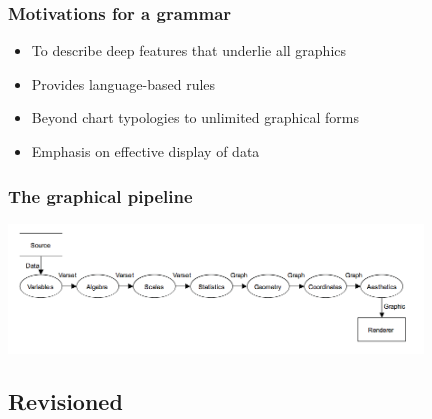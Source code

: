 \documentclass{beamer}
\begin{document}
\begin{frame}\frametitle{Motivations for a grammar}
	\begin{itemize}
		\item To describe deep features that underlie all graphics
		\item Provides language-based rules
		\item Beyond chart typologies to unlimited graphical forms 
		\item Emphasis on effective display of data 
	\end{itemize}
\end{frame}



\begin{frame}\frametitle{The graphical pipeline}
\includegraphics[width=110mm]{originalframework.png}
\end{frame}



\subsection{Revisioned}

\end{document}
